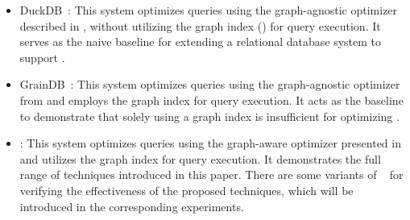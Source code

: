 \begin{itemize}
\item DuckDB~\cite{duckdb}: This system optimizes queries using the graph-agnostic optimizer described in , without utilizing the graph index () for query execution. It serves as the naive baseline for extending a relational database system to support \spjm.

\item GrainDB~\cite{duckdb}: This system optimizes queries using the graph-agnostic optimizer from  and employs the graph index for query execution. It acts as the baseline to demonstrate that solely using a graph index is insufficient for optimizing \spjm.


\item \name: This system optimizes queries using the graph-aware optimizer presented in  and utilizes the graph index for query execution. It demonstrates the full range of techniques introduced in this paper. There are some variants
of \name~ for verifying the effectiveness of the proposed techniques, which will be introduced in the corresponding experiments.
\end{itemize}

